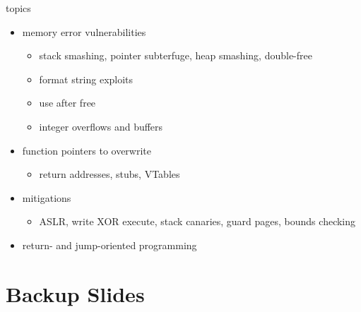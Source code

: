 \begin{frame}{topics}
    \begin{itemize}
    \item memory error vulnerabilities
        \begin{itemize}
        \item stack smashing, pointer subterfuge, heap smashing, double-free
        \item format string exploits
        \item use after free
        \item integer overflows and buffers
        \end{itemize}
    \item function pointers to overwrite
        \begin{itemize}
        \item return addresses, stubs, VTables
        \end{itemize}
    \item mitigations
        \begin{itemize}
        \item ASLR, write XOR execute, stack canaries, guard pages, bounds checking
        \end{itemize}
    \item return- and jump-oriented programming
    \end{itemize}
\end{frame}

\section{Backup Slides}

